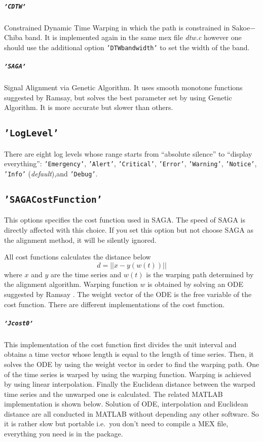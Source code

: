 \documentclass{article}
\newcommand{\parametre}[1]{\texttt{#1}}
\begin{document}
\subparagraph*{\parametre{'CDTW'}} Constrained Dynamic Time Warping in which the path is constrained in Sakoe$-$Chiba band. It is implemented again in the same mex file \textit{dtw.c} however one should use the additional option \parametre{'DTWbandwidth'} to set the width of the band.

\subparagraph*{\parametre{'SAGA'}} Signal Alignment via Genetic Algorithm. It uses smooth monotone functions suggested by Ramsay\cite{Ramsay1998}, but solves the best parameter set by using Genetic Algorithm\cite{Kaya2013113}. It is more accurate but slower than others.

\subsection{\parametre{'LogLevel'}}
There are eight log levels whose range starts from ``absolute silence'' to ``display everything'': \parametre{'Emergency'}, \parametre{'Alert'}, \parametre{'Critical'}, \parametre{'Error'}, \parametre{'Warning'}, \parametre{'Notice'}, \parametre{'Info'} (\textit{default}),and \parametre{'Debug'}.  
 
\subsection{\parametre{'SAGACostFunction'}} 
This options specifies the cost function used in SAGA.\@ 
The speed of SAGA is directly affected with this choice. If you set this option but not choose SAGA as the alignment method, it will be silently ignored.

All cost functions calculates the distance below 
$$ d = || x - y(w(t)) ||$$
where $x$ and $y$ are the time series and $w(t)$ is the warping path determined by the alignment algorithm. Warping function $w$ is obtained by solving an ODE suggested by Ramsay \cite{Ramsay1998}. The weight vector of the ODE is the free variable of the cost function. There are different implementations of the cost function.

\subparagraph*{\parametre{'Jcost0'}} This implementation of the cost function first divides the unit interval and obtains a time vector whose length is equal to the length of time series. 
Then, it solves the ODE by using the weight vector in order to find the warping path. 
One of the time series is warped by using the warping function. 
Warping is achieved by using linear interpolation. 
Finally the Euclidean distance between the warped time series and the unwarped one is calculated. 
The related MATLAB implementation is shown below. 
Solution of ODE, interpolation and Euclidean distance are all conducted in MATLAB without depending any other software. 
So it is rather slow but portable i.e.\ you don't need to compile a MEX file, everything you need is in the package. 
\end{document}
